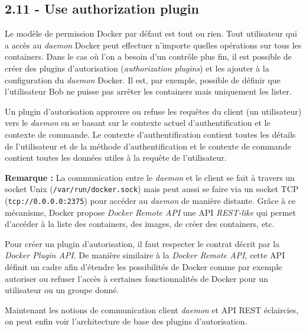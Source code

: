 \documentclass[11pt,a4paper,oneside]{report}
\newcommand{\code}[1]{\texttt{#1}}
\begin{document}
\subsection{2.11 - Use authorization plugin}
Le modèle de permission Docker par défaut est tout ou rien. Tout utilisateur qui a accès au \textit{daemon} Docker peut effectuer n'importe quelles opérations sur tous les containers. Dans le cas où l'on a besoin d'un contrôle plus fin, il est possible de créer des plugins d'autorisation (\textit{authorization plugins}) et les ajouter à la configuration du \textit{daemon} Docker. Il est, par exemple, possible de définir que l'utilisateur Bob ne puisse pas arrêter les containers mais uniquement les lister.

Un plugin d'autorisation approuve ou refuse les requêtes du client (un utilisateur)  vers le \textit{daemon} en se basant sur le contexte actuel d'authentification et le contexte de commande. Le contexte d'authentification contient toutes les détails de l'utilisateur et de la méthode d'authentification et le contexte de commande contient toutes les données utiles à la requête de l'utilisateur.

\textbf{Remarque : } La communication entre le \textit{daemon} et le client\cite{docker_doc_daemon} se fait à travers un socket Unix (\code{/var/run/docker.sock}) mais peut aussi se faire via un socket TCP (\code{tcp://0.0.0.0:2375}) pour accéder au \textit{daemon} de manière distante. Grâce à ce mécanisme, Docker propose \textit{Docker Remote API}\cite{docker_doc_remote_api} une API \textit{REST-like} qui permet d'accéder à la liste des containers, des images, de créer des containers, etc.

Pour créer un plugin d'autorisation, il faut respecter le contrat décrit par la \textit{Docker Plugin API}. De manière similaire à la \textit{Docker Remote API}, cette API définit un cadre afin d'étendre les possibilités de Docker comme par exemple autoriser ou refuser l'accès à certaines fonctionnalités de Docker pour un utilisateur ou un groupe donné.


Maintenant les notions de communication client \textit{daemon} et API REST éclaircies, on peut enfin voir l'architecture de base des plugins d'autorisation.
\end{document}
